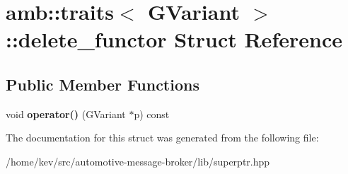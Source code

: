 \hypertarget{structamb_1_1traits_3_01GVariant_01_4_1_1delete__functor}{\section{amb\+:\+:traits$<$ G\+Variant $>$\+:\+:delete\+\_\+functor Struct Reference}
\label{structamb_1_1traits_3_01GVariant_01_4_1_1delete__functor}
}
\subsection*{Public Member Functions}
\begin{DoxyCompactItemize}
\item 
\hypertarget{structamb_1_1traits_3_01GVariant_01_4_1_1delete__functor_aa0393bd9227a3112d0708e3b417de044}{void {\bfseries operator()} (G\+Variant $\ast$p) const }\label{structamb_1_1traits_3_01GVariant_01_4_1_1delete__functor_aa0393bd9227a3112d0708e3b417de044}

\end{DoxyCompactItemize}


The documentation for this struct was generated from the following file\+:\begin{DoxyCompactItemize}
\item 
/home/kev/src/automotive-\/message-\/broker/lib/superptr.\+hpp\end{DoxyCompactItemize}
